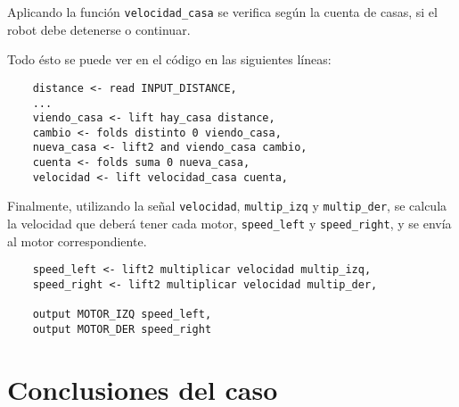   Aplicando la función \texttt{velocidad\_casa} se verifica
según la cuenta de casas, si el robot debe detenerse o continuar.

  Todo ésto se puede ver en el código en las siguientes líneas:

  \begin{verbatim}
    distance <- read INPUT_DISTANCE,
    ...
    viendo_casa <- lift hay_casa distance,
    cambio <- folds distinto 0 viendo_casa,
    nueva_casa <- lift2 and viendo_casa cambio,
    cuenta <- folds suma 0 nueva_casa,
    velocidad <- lift velocidad_casa cuenta,
  \end{verbatim}

  Finalmente, utilizando la señal \texttt{velocidad}, \texttt{multip\_izq}
  y \texttt{multip\_der}, se calcula la velocidad que deberá tener cada
  motor, \texttt{speed\_left} y \texttt{speed\_right}, y se envía al
  motor correspondiente.

  \begin{verbatim}
    speed_left <- lift2 multiplicar velocidad multip_izq,
    speed_right <- lift2 multiplicar velocidad multip_der,

    output MOTOR_IZQ speed_left,
    output MOTOR_DER speed_right
  \end{verbatim}





\section {Conclusiones del caso}


